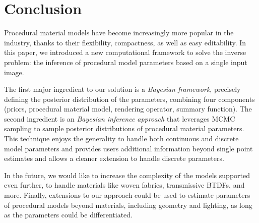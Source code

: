 \section{Conclusion}
\label{sec:conclusion}
%
%
Procedural material models have become increasingly more popular in the industry, thanks to their flexibility, compactness, as well as easy editability.
In this paper, we introduced a new computational framework to solve the inverse problem: the inference of procedural model parameters based on a single input image.

The first major ingredient to our solution is a \emph{Bayesian framework}, precisely defining the posterior distribution of the parameters, combining four components (priors, procedural material model, rendering operator, summary function). The second ingredient is an \emph{Bayesian inference approach} that leverages MCMC sampling to sample posterior distributions of procedural material parameters.  This technique enjoys the generality to handle both continuous and discrete model parameters and provides users additional information beyond single point estimates and allows a cleaner extension to handle discrete parameters.

In the future, we would like to increase the complexity of the models supported even further, to handle materials like woven fabrics, transmissive BTDFs, and more. Finally, extensions to our approach could be used to estimate parameters of procedural models beyond materials, including geometry and lighting, as long as the parameters could be differentiated.
